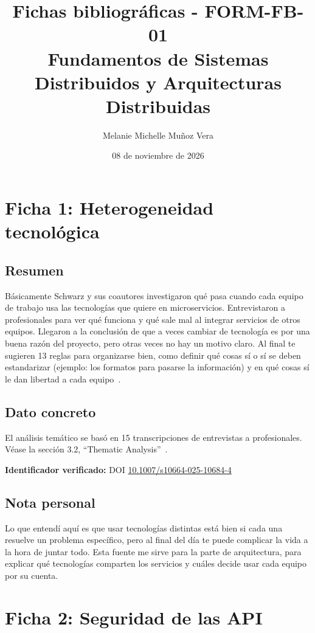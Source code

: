 \documentclass[12pt,a4paper]{article}
\title{Fichas bibliográficas - FORM-FB-01\\
Fundamentos de Sistemas Distribuidos y Arquitecturas Distribuidas}
\author{Melanie Michelle Muñoz Vera}
\date{08 de noviembre de 2026}
\begin{document}
\maketitle

\section*{Ficha 1: Heterogeneidad tecnológica}

\subsection*{Resumen}

Básicamente Schwarz y sus coautores investigaron qué pasa cuando cada equipo de trabajo usa las tecnologías que quiere en microservicios. Entrevistaron a profesionales para ver qué funciona y qué sale mal al integrar servicios de otros equipos. Llegaron a la conclusión de que a veces cambiar de tecnología es por una buena razón del proyecto, pero otras veces no hay un motivo claro. Al final te sugieren 13 reglas para organizarse bien, como definir qué cosas sí o sí se deben estandarizar (ejemplo: los formatos para pasarse la información) y en qué cosas sí le dan libertad a cada equipo~\cite{schwarz2025}.

\subsection*{Dato concreto}

El análisis temático se basó en 15 transcripciones de entrevistas a profesionales. Véase la sección 3.2, ``Thematic Analysis''~\cite{schwarz2025}.

\textbf{Identificador verificado:} DOI \href{https://doi.org/10.1007/s10664-025-10684-4}{10.1007/s10664-025-10684-4}

\subsection*{Nota personal}

Lo que entendí aquí es que usar tecnologías distintas está bien si cada una resuelve un problema específico, pero al final del día te puede complicar la vida a la hora de juntar todo. Esta fuente me sirve para la parte de arquitectura, para explicar qué tecnologías comparten los servicios y cuáles decide usar cada equipo por su cuenta.

\section*{Ficha 2: Seguridad de las API}
\end{document}
